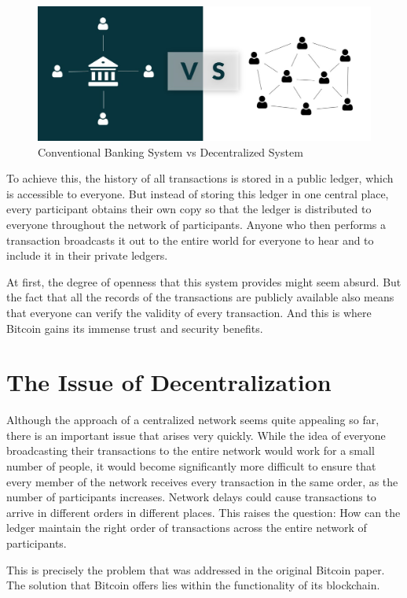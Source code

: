\documentclass[a4paper, 12pt]{report}
\begin{document}
\begin{figure}[H]
	\includegraphics[width=\textwidth]{01_Decentralized}
	\caption{Conventional Banking System vs Decentralized System}
	\label{fig:01_Decentralized}
\end{figure}

\par To achieve this, the history of all transactions is stored in a public ledger, which is accessible to everyone. But instead of storing this ledger in one central place, every participant obtains their own copy so that the ledger is distributed to everyone throughout the network of participants. Anyone who then performs a transaction broadcasts it out to the entire world for everyone to hear and to include it in their private ledgers. 
\par At first, the degree of openness that this system provides might seem absurd. But the fact that all the records of the transactions are publicly available also means that everyone can verify the validity of every transaction. And this is where Bitcoin gains its immense trust and security benefits.

\section{The Issue of Decentralization}
\par Although the approach of a centralized network seems quite appealing so far, there is an important issue that arises very quickly. While the idea of everyone broadcasting their transactions to the entire network would work for a small number of people, it would become significantly more difficult to ensure that every member of the network receives every transaction in the same order, as the number of participants increases. Network delays could cause transactions to arrive in different orders in different places. This raises the question: How can the ledger maintain the right order of transactions across the entire network of participants. 
\par This is precisely the problem that was addressed in the original Bitcoin paper. The solution that Bitcoin offers lies within the functionality of its blockchain.
\end{document}
